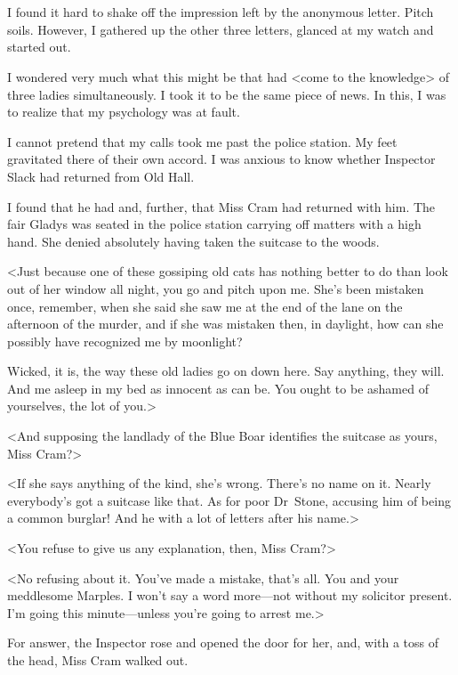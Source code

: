 \chapter[Chapter  \thechapter]{}


\lettrine{I}{} found it hard to shake off the impression left by the anonymous letter. Pitch soils. However, I gathered up the other three letters, glanced at my watch and started out.

\zz
I wondered very much what this might be that had <come to the knowledge> of three ladies simultaneously. I took it to be the same piece of news. In this, I was to realize that my psychology was at fault.

I cannot pretend that my calls took me past the police station. My feet gravitated there of their own accord. I was anxious to know whether Inspector Slack had returned from Old Hall.

I found that he had and, further, that Miss Cram had returned with him. The fair Gladys was seated in the police station carrying off matters with a high hand. She denied absolutely having taken the suitcase to the woods.

<Just because one of these gossiping old cats has nothing better to do than look out of her window all night, you go and pitch upon me. She's been mistaken once, remember, when she said she saw me at the end of the lane on the afternoon of the murder, and if she was mistaken then, in daylight, how can she possibly have recognized me by moonlight?

Wicked, it is, the way these old ladies go on down here. Say anything, they will. And me asleep in my bed as innocent as can be. You ought to be ashamed of yourselves, the lot of you.>

<And supposing the landlady of the Blue Boar identifies the suitcase as yours, Miss Cram?>

<If she says anything of the kind, she's wrong. There's no name on it. Nearly everybody's got a suitcase like that. As for poor Dr~Stone, accusing him of being a common burglar! And he with a lot of letters after his name.>

<You refuse to give us any explanation, then, Miss Cram?>

<No refusing about it. You've made a mistake, that's all. You and your meddlesome Marples. I won't say a word more—not without my solicitor present. I'm going this minute—unless you're going to arrest me.>

For answer, the Inspector rose and opened the door for her, and, with a toss of the head, Miss Cram walked out.

